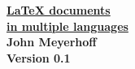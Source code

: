 \begin{titlepage}
    \begin{center}
        \Huge\bfseries\underline{LaTeX documents}\\
        \Huge\bfseries\underline{in multiple languages}\\
        \vspace{1.5cm}
        {\Large John Meyerhoff}\\
        \vspace{2.5cm}
        {\large Version 0.1}
        \vfill
    \end{center}
\end{titlepage}


